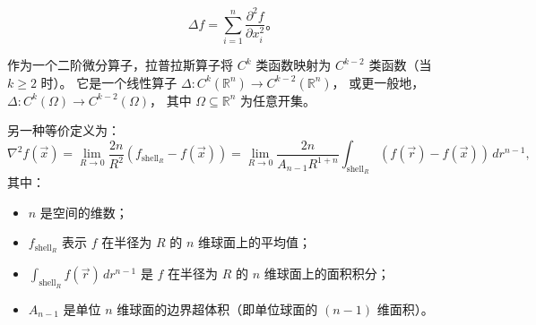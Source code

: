 \[
\Delta f = \sum_{i=1}^{n} \frac{\partial^{2} f}{\partial x_{i}^{2}}。
\tag{2}
\]

作为一个二阶微分算子，拉普拉斯算子将 $C^{k}$ 类函数映射为 $C^{k-2}$ 类函数（当 $k \ge 2$ 时）。
它是一个线性算子 $\Delta : C^{k}(\mathbb{R}^{n}) \to C^{k-2}(\mathbb{R}^{n})$，
或更一般地，$\Delta : C^{k}(\Omega) \to C^{k-2}(\Omega)$，
其中 $\Omega \subseteq \mathbb{R}^{n}$ 为任意开集。

另一种等价定义为：
\[
\nabla^{2} f(\vec{x})
= \lim_{R \to 0} \frac{2n}{R^{2}} \left(f_{\text{shell}_{R}} - f(\vec{x})\right)
= \lim_{R \to 0} \frac{2n}{A_{n-1} R^{1+n}}
\int_{\text{shell}_{R}} \left( f(\vec{r}) - f(\vec{x}) \right) \, d r^{n-1},
\]
其中：
\begin{itemize}
  \item $n$ 是空间的维数；
  \item $f_{\text{shell}_{R}}$ 表示 $f$ 在半径为 $R$ 的 $n$ 维球面上的平均值；
  \item $\displaystyle \int_{\text{shell}_{R}} f(\vec{r}) \, d r^{n-1}$ 是 $f$ 在半径为 $R$ 的 $n$ 维球面上的面积积分；
  \item $A_{n-1}$ 是单位 $n$ 维球面的边界超体积（即单位球面的 $(n-1)$ 维面积）\cite{1}。
\end{itemize}
